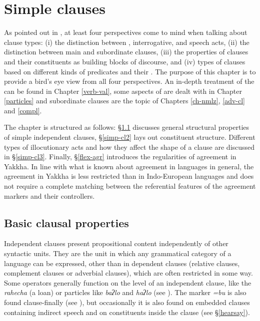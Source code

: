 ﻿\chapter{Simple clauses}\label{simp-cl}

As pointed out in \citet[224]{Dryer2007Clause}, at least four perspectives come to mind when talking about clause types: (i) the  distinction between , interrogative, and  speech acts, (ii) the distinction between main and subordinate clauses, (iii) the properties of clauses and their constituents as building blocks of discourse, and (iv) types of clauses based on different kinds of predicates and their . The purpose of this chapter is to provide a bird's eye view from all four perspectives. An in-depth treatment of the  can be found in Chapter \ref{verb-val}, some aspects of  are dealt with in Chapter \ref{particles} and subordinate clauses are the topic of  Chapters \ref{ch-nmlz},  \ref{adv-cl} and  \ref{compl}.  

The chapter is structured as follows: §\ref{simp-cl1} discusses general structural properties of simple independent clauses, §\ref{simp-cl2} lays out constituent structure. Different types of illocutionary acts and how they affect the shape of a clause are discussed in §\ref{simp-cl3}. Finally, §\ref{flex-agr} introduces the regularities of agreement in Yakkha. In line with what is known about agreement in  languages in general, the agreement in Yakkha is less restricted than in Indo-European languages and does not require a complete matching between the referential features of the agreement markers and their controllers.

\section{Basic clausal properties}\label{simp-cl1}

Independent clauses present propositional content independently of other syntactic units. They are the unit in which any grammatical category of a language can be expressed, other than in dependent clauses (relative clauses, complement clauses or adverbial clauses), which are often restricted in some way. Some operators generally function on the level of an independent clause, like the  \emph{rahecha} (a  loan) or   particles like  \emph{baʔlo} and \emph{haʔlo} (see \Next[a]). The  marker \emph{=bu} is also found clause-finally (see \Next[b]), but occasionally it is also found   on embedded clauses containing indirect speech and on constituents inside the clause (see §\ref{hearsay}). 
 
